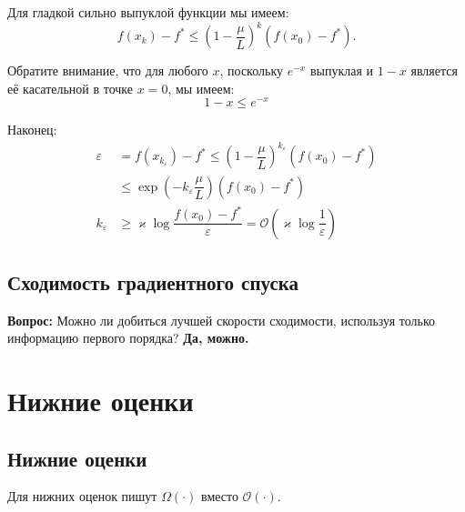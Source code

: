 \documentclass[
  russian,
  letterpaper,
  DIV=11,
  numbers=noendperiod]{scrartcl}
\begin{document}
Для гладкой сильно выпуклой функции мы имеем: \[
f(x_{k})-f^* \leq \left(1- \dfrac{\mu}{L}\right)^k (f(x_0)-f^*).
\]

Обратите внимание, что для любого \(x\), поскольку \(e^{-x}\) выпуклая и
\(1-x\) является её касательной в точке \(x=0\), мы имеем: \[
1 - x \leq e^{-x}
\]

Наконец: \[
\begin{aligned}
\varepsilon &= f(x_{k_\varepsilon})-f^* \leq  \left(1- \dfrac{\mu}{L}\right)^{k_\varepsilon} (f(x_0)-f^*) \\
&\leq \exp\left(- k_\varepsilon\dfrac{\mu}{L}\right) (f(x_0)-f^*) \\
k_\varepsilon &\geq \varkappa \log \dfrac{f(x_0)-f^*}{\varepsilon} = \mathcal{O} \left( \varkappa \log \dfrac{1}{\varepsilon}\right)
\end{aligned}
\]

\subsection{Сходимость градиентного
спуска}\label{ux441ux445ux43eux434ux438ux43cux43eux441ux442ux44c-ux433ux440ux430ux434ux438ux435ux43dux442ux43dux43eux433ux43e-ux441ux43fux443ux441ux43aux430-1}

\textbf{Вопрос: }Можно ли добиться лучшей скорости сходимости, используя
только информацию первого порядка? \textbf{Да, можно.}

\section{Нижние
оценки}\label{ux43dux438ux436ux43dux438ux435-ux43eux446ux435ux43dux43aux438}

\subsection{Нижние
оценки}\label{ux43dux438ux436ux43dux438ux435-ux43eux446ux435ux43dux43aux438-1}

Для нижних оценок пишут \(\Omega \left( \cdot \right)\) вместо
\(\mathcal{O} \left( \cdot \right)\).
\end{document}
